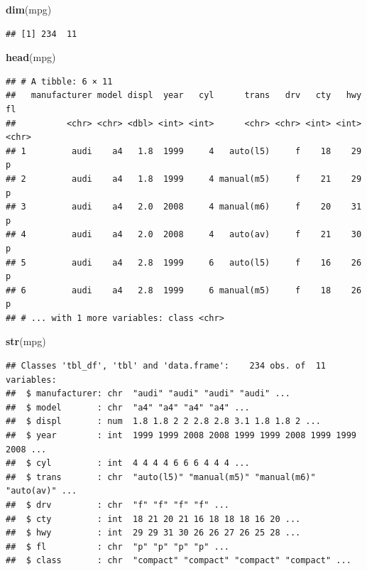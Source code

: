 \documentclass[]{book}
\newenvironment{Shaded}{\begin{snugshade}}{\end{snugshade}}
\newcommand{\KeywordTok}[1]{\textcolor[rgb]{0.13,0.29,0.53}{\textbf{{#1}}}}
\newcommand{\NormalTok}[1]{{#1}}
\begin{document}
\begin{Shaded}
\begin{Highlighting}[]
\KeywordTok{dim}\NormalTok{(mpg)}
\end{Highlighting}
\end{Shaded}

\begin{verbatim}
## [1] 234  11
\end{verbatim}

\begin{Shaded}
\begin{Highlighting}[]
\KeywordTok{head}\NormalTok{(mpg)}
\end{Highlighting}
\end{Shaded}

\begin{verbatim}
## # A tibble: 6 × 11
##   manufacturer model displ  year   cyl      trans   drv   cty   hwy    fl
##          <chr> <chr> <dbl> <int> <int>      <chr> <chr> <int> <int> <chr>
## 1         audi    a4   1.8  1999     4   auto(l5)     f    18    29     p
## 2         audi    a4   1.8  1999     4 manual(m5)     f    21    29     p
## 3         audi    a4   2.0  2008     4 manual(m6)     f    20    31     p
## 4         audi    a4   2.0  2008     4   auto(av)     f    21    30     p
## 5         audi    a4   2.8  1999     6   auto(l5)     f    16    26     p
## 6         audi    a4   2.8  1999     6 manual(m5)     f    18    26     p
## # ... with 1 more variables: class <chr>
\end{verbatim}

\begin{Shaded}
\begin{Highlighting}[]
\KeywordTok{str}\NormalTok{(mpg)}
\end{Highlighting}
\end{Shaded}

\begin{verbatim}
## Classes 'tbl_df', 'tbl' and 'data.frame':    234 obs. of  11 variables:
##  $ manufacturer: chr  "audi" "audi" "audi" "audi" ...
##  $ model       : chr  "a4" "a4" "a4" "a4" ...
##  $ displ       : num  1.8 1.8 2 2 2.8 2.8 3.1 1.8 1.8 2 ...
##  $ year        : int  1999 1999 2008 2008 1999 1999 2008 1999 1999 2008 ...
##  $ cyl         : int  4 4 4 4 6 6 6 4 4 4 ...
##  $ trans       : chr  "auto(l5)" "manual(m5)" "manual(m6)" "auto(av)" ...
##  $ drv         : chr  "f" "f" "f" "f" ...
##  $ cty         : int  18 21 20 21 16 18 18 18 16 20 ...
##  $ hwy         : int  29 29 31 30 26 26 27 26 25 28 ...
##  $ fl          : chr  "p" "p" "p" "p" ...
##  $ class       : chr  "compact" "compact" "compact" "compact" ...
\end{verbatim}
\end{document}
